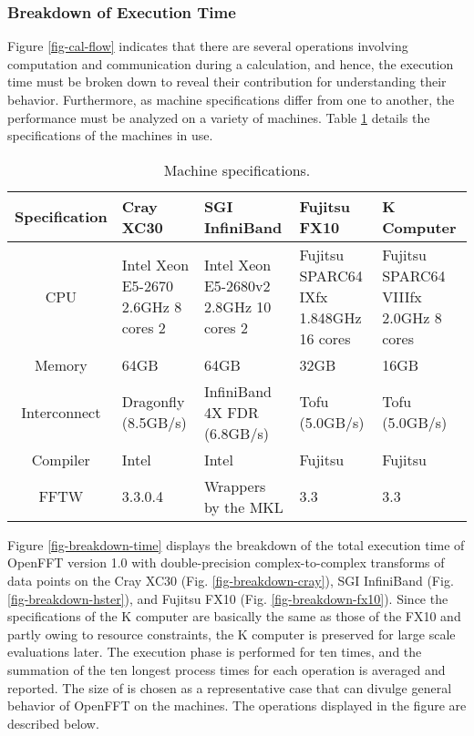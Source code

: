 \subsubsection{Breakdown of Execution Time}

Figure \ref{fig-cal-flow} indicates that there are several operations involving computation and communication during a calculation, and hence, the execution time must be broken down to reveal their contribution for understanding their behavior. Furthermore, as machine specifications differ from one to another, the performance must be analyzed on a variety of machines. Table \ref{tab-spec-machine} details the specifications of the machines in use.

\begin{table}
\begin{center}
\caption{Machine specifications.}
\label{tab-spec-machine}
\begin{tabular}{| c || m{} | m{} | m{} | m{} |}
\hline
Specification & Cray XC30 & SGI InfiniBand & Fujitsu FX10 & K   \quad\quad\quad Computer \\
\hline
CPU           & Intel Xeon E5-2670 2.6GHz 8 cores  2 & Intel Xeon E5-2680v2 2.8GHz 10 cores  2 &  Fujitsu SPARC64 IXfx 1.848GHz 16 cores  & Fujitsu SPARC64 VIIIfx 2.0GHz 8 cores   \\
\hline
Memory        &     64GB  &   64GB   & 32GB &   16GB        \\
\hline
Interconnect  & Dragonfly (8.5GB/s) &  InfiniBand 4X FDR (6.8GB/s) &  Tofu (5.0GB/s)   &   Tofu (5.0GB/s)    \\
\hline
Compiler     &     Intel &  Intel   &  Fujitsu  &     Fujitsu       \\
\hline
FFTW          &  3.3.0.4 &  Wrappers by the MKL &   3.3   &   3.3      \\
\hline
\end{tabular}
\end{center}
\end{table}

Figure \ref{fig-breakdown-time} displays the breakdown of the total execution time of OpenFFT version 1.0 with double-precision complex-to-complex transforms of  data points on the Cray XC30 (Fig. \ref{fig-breakdown-cray}), SGI InfiniBand (Fig. \ref{fig-breakdown-hster}), and Fujitsu FX10 (Fig. \ref{fig-breakdown-fx10}). Since the specifications of the K computer are basically the same as those of the FX10 and partly owing to resource constraints, the K computer is preserved for large scale evaluations later. The execution phase is performed for ten times, and the summation of the ten longest process times for each operation is averaged and reported. The size of  is chosen as a representative case that can divulge general behavior of OpenFFT on the machines. The operations displayed in the figure are described below. 

